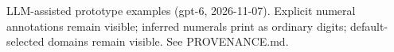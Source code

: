 \documentclass[11pt]{article}
\begin{document}


\newpage

\bigskip
{\footnotesize LLM-assisted prototype examples (gpt-6, 2026-11-07).
Explicit numeral annotations remain visible; inferred numerals print as ordinary digits; default-selected domains remain visible. See PROVENANCE.md.}
\end{document}
